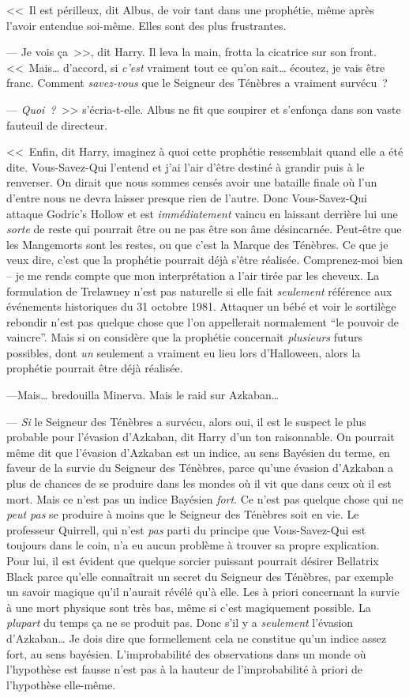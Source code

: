 <<~Il est périlleux, dit Albus, de voir tant dans une prophétie, même après l'avoir entendue soi-même. Elles sont des plus frustrantes.

--- Je vois ça~>>, dit Harry. Il leva la main, frotta la cicatrice sur son front. <<~Mais… d'accord, si \emph{c'est} vraiment tout ce qu'on sait… écoutez, je vais être franc. Comment \emph{savez-vous} que le Seigneur des Ténèbres a vraiment survécu~?

--- \emph{Quoi~?}~>> s'écria-t-elle. Albus ne fit que soupirer et s'enfonça dans son vaste fauteuil de directeur.

<<~Enfin, dit Harry, imaginez à quoi cette prophétie ressemblait quand elle a été dite. Vous-Savez-Qui l'entend et j'ai l'air d'être destiné à grandir puis à le renverser. On dirait que nous sommes censés avoir une bataille finale où l'un d'entre nous ne devra laisser presque rien de l'autre. Donc Vous-Savez-Qui attaque Godric's Hollow et est \emph{immédiatement} vaincu en laissant derrière lui une \emph{sorte} de reste qui pourrait être ou ne pas être son âme désincarnée. Peut-être que les Mangemorts sont les restes, ou que c'est la Marque des Ténèbres. Ce que je veux dire, c'est que la prophétie pourrait déjà s'être réalisée. Comprenez-moi bien -- je me rends compte que mon interprétation a l'air tirée par les cheveux. La formulation de Trelawney n'est pas naturelle si elle fait \emph{seulement} référence aux événements historiques du 31 octobre 1981. Attaquer un bébé et voir le sortilège rebondir n'est pas quelque chose que l'on appellerait normalement “le pouvoir de vaincre”. Mais si on considère que la prophétie concernait \emph{plusieurs} futurs possibles, dont \emph{un} seulement a vraiment eu lieu lors d'Halloween, alors la prophétie pourrait être déjà réalisée.

---Mais… bredouilla Minerva. Mais le raid sur Azkaban…

--- \emph{Si} le Seigneur des Ténèbres a survécu, alors oui, il est le suspect le plus probable pour l'évasion d'Azkaban, dit Harry d'un ton raisonnable. On pourrait même dit que l'évasion d'Azkaban est un indice, au sens Bayésien du terme, en faveur de la survie du Seigneur des Ténèbres, parce qu'une évasion d'Azkaban a plus de chances de se produire dans les mondes où il vit que dans ceux où il est mort. Mais ce n'est pas un indice Bayésien \emph{fort}. Ce n'est pas quelque chose qui ne \emph{peut pas} se produire à moins que le Seigneur des Ténèbres soit en vie. Le professeur Quirrell, qui n'est \emph{pas} parti du principe que Vous-Savez-Qui est toujours dans le coin, n'a eu aucun problème à trouver sa propre explication. Pour lui, il est évident que quelque sorcier puissant pourrait désirer Bellatrix Black parce qu'elle connaîtrait un secret du Seigneur des Ténèbres, par exemple un savoir magique qu'il n'aurait révélé qu'à elle. Les à priori concernant la survie à une mort physique sont très bas, même si c'est magiquement possible. La \emph{plupart} du temps ça ne se produit pas. Donc s'il y a \emph{seulement} l'évasion d'Azkaban… Je dois dire que formellement cela ne constitue qu'un indice assez fort, au sens bayésien. L'improbabilité des observations dans un monde où l'hypothèse est fausse n'est pas à la hauteur de l'improbabilité à priori de l'hypothèse elle-même.

